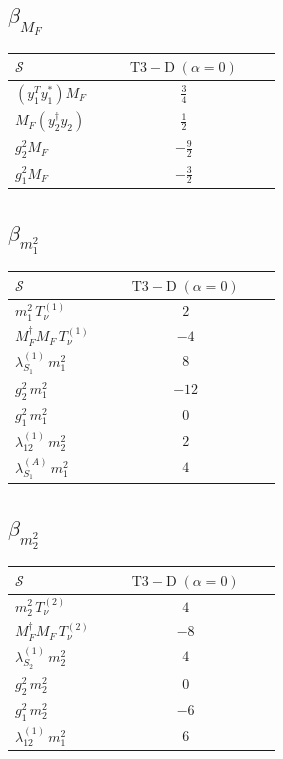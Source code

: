\documentclass[9pt]{article}
\begin{document}
\subsection*{$ \beta_{M_F} $}
\begin{longtable}{@{}p{0.31\linewidth}c@{}}
\toprule
$\mathcal{S}$ & $ \mathrm{T3-D}\;(\alpha=0) $ \\
\midrule
$ (y_1^T y_1^*)M_F $ & $ \frac{3}{4} $ \\
$ M_F(y_2^\dagger y_2) $ & $ \frac{1}{2} $ \\
$ g_2^2M_F $ & $ - \frac{9}{2} $ \\
$ g_1^2M_F $ & $ - \frac{3}{2} $ \\
\bottomrule
\end{longtable}
\subsection*{$ \beta_{m_1^{2}} $}
\begin{longtable}{@{}p{0.31\linewidth}c@{}}
\toprule
$\mathcal{S}$ & $ \mathrm{T3-D}\;(\alpha=0) $ \\
\midrule
$ m_1^{2}\,T_{\nu}^{(1)} $ & $ 2 $ \\
$ M_F^\dagger M_F\,T_{\nu}^{(1)} $ & $ -4 $ \\
$ \lambda_{S_1}^{(1)}\,m_1^{2} $ & $ 8 $ \\
$ g_2^2\,m_1^{2} $ & $ -12 $ \\
$ g_1^2\,m_1^{2} $ & $ 0 $ \\
$ \lambda_{12}^{(1)}\,m_2^{2} $ & $ 2 $ \\
$ \lambda_{S_1}^{(A)}\,m_1^{2} $ & $ 4 $ \\
\bottomrule
\end{longtable}
\subsection*{$ \beta_{m_2^{2}} $}
\begin{longtable}{@{}p{0.31\linewidth}c@{}}
\toprule
$\mathcal{S}$ & $ \mathrm{T3-D}\;(\alpha=0) $ \\
\midrule
$ m_2^{2}\,T_{\nu}^{(2)} $ & $ 4 $ \\
$ M_F^\dagger M_F\,T_{\nu}^{(2)} $ & $ -8 $ \\
$ \lambda_{S_2}^{(1)}\,m_2^{2} $ & $ 4 $ \\
$ g_2^2\,m_2^{2} $ & $ 0 $ \\
$ g_1^2\,m_2^{2} $ & $ -6 $ \\
$ \lambda_{12}^{(1)}\,m_1^{2} $ & $ 6 $ \\
\bottomrule
\end{longtable}
\end{document}
